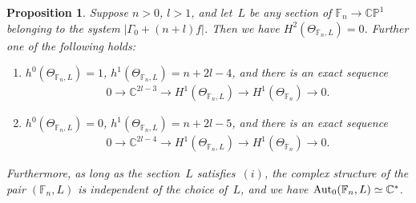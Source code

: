 \documentclass[11pt]{article}
\numberwithin{equation}{section}
\newtheorem{Proposition}[Theorem]{Proposition}
{\theoremstyle{definition}
\newtheorem{Definition}[Theorem]{Definition}
\newtheorem{Remark}[Theorem]{Remark}
}
\begin{document}
\begin{Proposition}\label{prop:l2}
Suppose $n>0$, $l>1$, and let~$L$ be any section of $\mathbb{F}_n\to \mathbb{CP}^1$ belonging to the system $|\Gamma_0+(n+l)f|$.
Then we have $H^2(\Theta_{\mathbb{F}_n,L})=0$.
Further one of the following holds:
\begin{enumerate}\itemsep=0pt
\item[$(i)$] $h^0(\Theta_{\mathbb{F}_n, L}) = 1$, $h^1(\Theta_{\mathbb{F}_n, L}) = n+2l-4$, and there is an exact
sequence
\begin{gather*}
0
\longrightarrow
\mathbb{C}^{2l-3}
\longrightarrow
H^1(\Theta_{\mathbb{F}_n,L})
\longrightarrow
H^1(\Theta_{\mathbb{F}_n})
\longrightarrow
0.
\end{gather*}
\item[$(ii)$] $h^0(\Theta_{\mathbb{F}_n, L}) = 0$, $h^1(\Theta_{\mathbb{F}_n, L}) = n+2l-5$, and there is an exact
sequence
\begin{gather*}
0
\longrightarrow
\mathbb{C}^{2l-4}
\longrightarrow
H^1(\Theta_{\mathbb{F}_n,L})
\longrightarrow
H^1(\Theta_{\mathbb{F}_n})
\longrightarrow
0.
\end{gather*}
\end{enumerate}
Furthermore, as long as the section~$L$ satisfies~$(i)$, the complex structure of the pair $(\mathbb{F}_n,L)$ is
independent of the choice of~$L$, and we have ${\rm{Aut}}_0(\mathbb{F}_n, L) \simeq \mathbb{C}^*$.
\end{Proposition}
\end{document}
